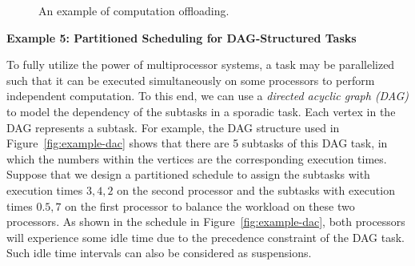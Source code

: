 \begin{figure}[t]
  \centering
{}
  \caption{An example of computation offloading.}
  \label{fig:offloading}
\end{figure}


{\bf Example 5: Partitioned Scheduling for DAG-Structured Tasks}

To fully utilize the power of multiprocessor systems, a task may be parallelized such that it can be executed simultaneously on some processors to perform independent computation. To this end, we can use a \emph{directed acyclic graph (DAG)} to model the dependency of the subtasks in a sporadic task. Each vertex in the DAG represents a subtask. For example, the DAG structure used in Figure~\ref{fig:example-dac} shows that there are 5 subtasks of this DAG task, in which the numbers within the vertices are the corresponding execution times. Suppose that we design a partitioned schedule to assign the subtasks with execution times $3,4,2$ on the second processor and the subtasks with execution times $0.5, 7$ on the first processor to balance the workload on these two processors. As shown in the schedule in Figure~\ref{fig:example-dac}, both processors will experience some idle time 
due to the precedence constraint of the DAG task. Such idle time intervals can also be considered as suspensions. 




